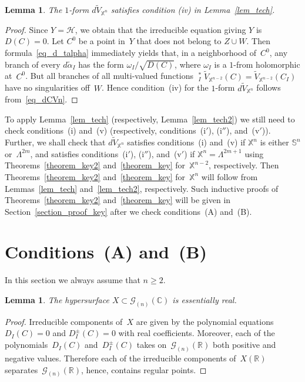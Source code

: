 \documentclass[reqno,tbtags,12pt]{amsart}
\numberwithin{equation}{section}
\newcommand{\R}{\mathbb{R}}
\newcommand{\CH}{\mathcal{H}}
\newcommand{\C}{\mathbb{C}}
\newcommand{\X}{\mathbb{X}}
\newcommand{\bS}{\mathbb{S}}
\newcommand{\tV}{\widetilde{V}}
\newcommand{\talpha}{\widetilde{\alpha}}
\newcommand{\CG}{\mathcal{G}}
\newcommand{\tpr}{\mathop{\widetilde{\mathrm{pr}}}\nolimits}
\newtheorem{lem}[theorem]{Lemma}
\theoremstyle{definition}
\begin{document}
\begin{lem}\label{lem-iv-a}
The $1$-form $d\tV_{\X^n}$ satisfies condition \textnormal{(iv)} in Lemma~\ref{lem_tech}.
\end{lem}

\begin{proof}
Since $Y=\CH$, we obtain that the irreducible equation giving $Y$ is $D(C)=0$. Let $C^0$ be a point in~$Y$ that does not belong to $Z\cup W$. Then formula~\eqref{eq_d_talpha} immediately yields that,  in a neighborhood of~$C^0$, any branch of every  $d\talpha_I$ has the form $\omega_I/\sqrt{D(C)}$, where $\omega_I$ is a  $1$-from holomorphic at~$C^0$. But all branches of all multi-valued functions $\tpr_I^*\tV_{\X^{n-2}}(C)= \tV_{\X^{n-2}}(C_I)$ have no singularities off~$W$. Hence condition~(iv) for the $1$-form $d\tV_{\X^n}$ follows from~\eqref{eq_dCVn}.
\end{proof}

To apply Lemma~\ref{lem_tech} (respectively, Lemma~\ref{lem_tech2}) we still need to check conditions~(i) and~(v) (respectively, conditions~(i${}'$), (i${}''$), and~(v${}'$)). Further,  we shall check that   $d\tV_{\X^n}$ satisfies conditions~(i) and~(v) if $\X^n$ is either $\bS^n$ or~$\Lambda^{2m}$, and satisfies conditions~(i${}'$), (i${}''$), and~(v${}'$)  if $\X^n=\Lambda^{2m+1}$ using Theorems~\ref{theorem_key2} and~\ref{theorem_key} for~$\X^{n-2}$, respectively. Then Theorems~\ref{theorem_key2} and~\ref{theorem_key} for~$\X^{n}$ will follow from Lemmas~\ref{lem_tech} and~\ref{lem_tech2}, respectively. Such inductive proofs of Theorems~\ref{theorem_key2} and~\ref{theorem_key} will be given in Section~\ref{section_proof_key} after we check conditions~(A) and~(B).



\section{Conditions~(A) and~(B)}\label{section_AB}


In this section we always assume that $n\ge 2$.

\begin{lem}
The hypersurface $X\subset\CG_{(n)}(\C)$ is essentially real. 
\end{lem}

\begin{proof}
Irreducible components of~$X$ are given by the polynomial equations~$D_I(C)=0$ and $D_I^{\pm}(C)=0$ with real coefficients.  Moreover, each of the polynomials~$D_I(C)$ and~$D_I^{\pm}(C)$ takes on~$\CG_{(n)}(\R)$ both positive and negative values.  Therefore each of the irreducible components of~$X(\R)$ separates~$\CG_{(n)}(\R)$, hence, contains regular points.
\end{proof}
\end{document}
